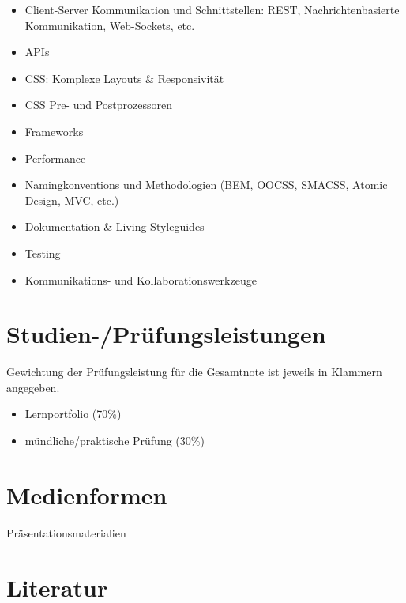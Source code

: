 \begin{itemize}
\tightlist
\item
  Client-Server Kommunikation und Schnittstellen: REST,
  Nachrichtenbasierte Kommunikation, Web-Sockets, etc.
\item
  APIs
\item
  CSS: Komplexe Layouts \& Responsivität
\item
  CSS Pre- und Postprozessoren
\item
  Frameworks
\item
  Performance
\item
  Namingkonventions und Methodologien (BEM, OOCSS, SMACSS, Atomic
  Design, MVC, etc.)
\item
  Dokumentation \& Living Styleguides
\item
  Testing
\item
  Kommunikations- und Kollaborationswerkzeuge
\end{itemize}

\section*{Studien-/Prüfungsleistungen\label{/mi-2017/modulbeschreibungen-master/MA_WTW_Modul_Web-Technologien}}\label{studien-pruxfcfungsleistungenpathlabelmi-2017modulbeschreibungen-mastermaux5fwtwux5fmodulux5fweb-technologien}

Gewichtung der Prüfungsleistung für die Gesamtnote ist jeweils in
Klammern angegeben.

\begin{itemize}
\tightlist
\item
  Lernportfolio (70\%)
\item
  mündliche/praktische Prüfung (30\%)
\end{itemize}

\section*{Medienformen\label{/mi-2017/modulbeschreibungen-master/MA_WTW_Modul_Web-Technologien}}\label{medienformenpathlabelmi-2017modulbeschreibungen-mastermaux5fwtwux5fmodulux5fweb-technologien}

Präsentationsmaterialien

\section*{Literatur\label{/mi-2017/modulbeschreibungen-master/MA_WTW_Modul_Web-Technologien}}\label{literaturpathlabelmi-2017modulbeschreibungen-mastermaux5fwtwux5fmodulux5fweb-technologien}

